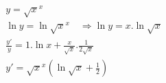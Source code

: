 \begin{ex}
\begin{align}
&y=\sqrt{x}^{x}\nonumber\\
&\ln{y}=\ln{\sqrt{x}^{x}}\quad \Rightarrow \ln{y}=x.\ln{\sqrt{x}}\nonumber\\
&\frac{y'}{y}=1.\ln{x}+\frac{x}{\sqrt{x}}.\frac{1}{2\sqrt{x}}\nonumber\\
&y'=\sqrt{x}^{x}\left(\ln{\sqrt{x}}+\frac{1}{2}\right)\nonumber
\end{align}
\end{ex}
